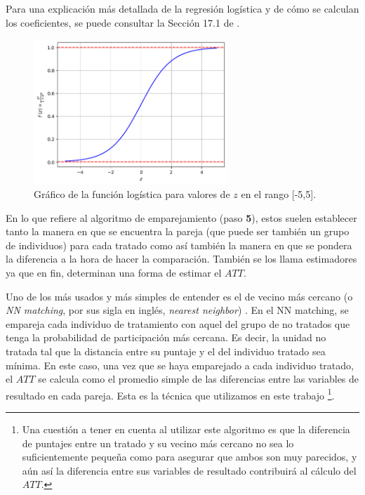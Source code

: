 \documentclass[../../main.tex]{subfiles}
\begin{document}
Para una explicación más detallada de la regresión logística y de cómo se calculan los
coeficientes, se puede consultar la Sección 17.1 de \cite{intro-econometria-wooldridge}.

\begin{figure}[ht]
    \centering
    \includegraphics[width=0.65\textwidth]{figs/logit.png}
    \caption{Gráfico de la función logística para valores de \(z\) en el rango [-5,5].}
    \label{fig:logit}
\end{figure}

En lo que refiere al algoritmo de emparejamiento (paso \textbf{5}), estos suelen
establecer tanto la manera en que se encuentra la pareja (que puede ser también un grupo
de individuos) para cada tratado como así también la manera en que se pondera la
diferencia a la hora de hacer la comparación. También se los llama estimadores ya que en
fin, determinan una forma de estimar el \(ATT\).

Uno de los más usados y más simples de entender es el de vecino más cercano (o \textit{NN
matching}, por sus sigla en inglés, \textit{nearest neighbor}) \cite{bernal}. En el NN
matching, se empareja cada individuo de tratamiento con aquel del grupo de no tratados que
tenga la probabilidad de participación más cercana. Es decir, la unidad no tratada tal que
la distancia entre su puntaje y el del individuo tratado sea mínima. En este caso, una vez
que se haya emparejado a cada individuo tratado, el \(ATT\) se calcula como el promedio
simple de las diferencias entre las variables de resultado en cada pareja. Esta es la
técnica que utilizamos en este trabajo \footnote{Una cuestión a tener en cuenta al
utilizar este algoritmo es que la diferencia de puntajes entre un tratado y su vecino más
cercano no sea lo suficientemente pequeña como para asegurar que ambos son muy parecidos,
y aún así la diferencia entre sus variables de resultado contribuirá al cálculo del
\(ATT\).}.
\end{document}

